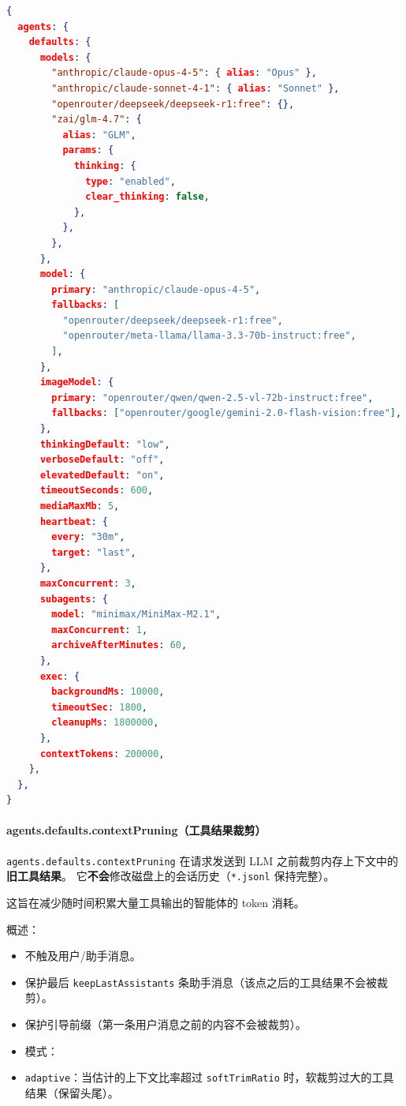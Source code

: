 \begin{lstlisting}[language=json]
{
  agents: {
    defaults: {
      models: {
        "anthropic/claude-opus-4-5": { alias: "Opus" },
        "anthropic/claude-sonnet-4-1": { alias: "Sonnet" },
        "openrouter/deepseek/deepseek-r1:free": {},
        "zai/glm-4.7": {
          alias: "GLM",
          params: {
            thinking: {
              type: "enabled",
              clear_thinking: false,
            },
          },
        },
      },
      model: {
        primary: "anthropic/claude-opus-4-5",
        fallbacks: [
          "openrouter/deepseek/deepseek-r1:free",
          "openrouter/meta-llama/llama-3.3-70b-instruct:free",
        ],
      },
      imageModel: {
        primary: "openrouter/qwen/qwen-2.5-vl-72b-instruct:free",
        fallbacks: ["openrouter/google/gemini-2.0-flash-vision:free"],
      },
      thinkingDefault: "low",
      verboseDefault: "off",
      elevatedDefault: "on",
      timeoutSeconds: 600,
      mediaMaxMb: 5,
      heartbeat: {
        every: "30m",
        target: "last",
      },
      maxConcurrent: 3,
      subagents: {
        model: "minimax/MiniMax-M2.1",
        maxConcurrent: 1,
        archiveAfterMinutes: 60,
      },
      exec: {
        backgroundMs: 10000,
        timeoutSec: 1800,
        cleanupMs: 1800000,
      },
      contextTokens: 200000,
    },
  },
}
\end{lstlisting}


\paragraph{agents.defaults.contextPruning（工具结果裁剪）}


\texttt{agents.defaults.contextPruning} 在请求发送到 LLM 之前裁剪内存上下文中的\textbf{旧工具结果}。
它\textbf{不会}修改磁盘上的会话历史（\texttt{*.jsonl} 保持完整）。

这旨在减少随时间积累大量工具输出的智能体的 token 消耗。

概述：

\begin{itemize}
  \item 不触及用户/助手消息。
  \item 保护最后 \texttt{keepLastAssistants} 条助手消息（该点之后的工具结果不会被裁剪）。
  \item 保护引导前缀（第一条用户消息之前的内容不会被裁剪）。
  \item 模式：
  \item \texttt{adaptive}：当估计的上下文比率超过 \texttt{softTrimRatio} 时，软裁剪过大的工具结果（保留头尾）。
\end{itemize}

